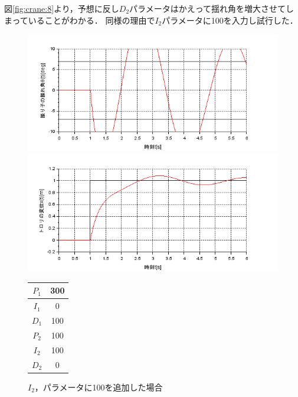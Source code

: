 \documentclass[dvipdfmx,titlepage,a4j]{jsarticle}  %
\begin{document}
図\ref{fig:crane:8}より，予想に反し$D_2$パラメータはかえって揺れ角を増大させてしまっていることがわかる．
同様の理由で$I_2$パラメータに100を入力し試行した．

\begin{figure}[H]
  \begin{minipage}{4.5cm}
    \centering
    \includegraphics[keepaspectratio, scale=0.35]{../graph/crane/ang-P1-300-I1-0-D1-100-P2-100-I2-100-D2-0.png}
  \end{minipage}
  \hfill
  \begin{minipage}{4.5cm}
    \centering
    \includegraphics[keepaspectratio, scale=0.35]{../graph/crane/po-P1-300-I1-0-D1-100-P2-100-I2-100-D2-0.png}
  \end{minipage}
  \hfill
  \begin{minipage}{3cm}
    \begin{center}
      \begin{tabular}{c|c}
        \hline
        $P_1$ & 300 \\ \hline
        $I_1$ & 0   \\ \hline
        $D_1$ & 100 \\ \hline
        $P_2$ & 100 \\ \hline
        $I_2$ & 100 \\ \hline
        $D_2$ & 0   \\
        \hline
      \end{tabular}
    \end{center}
  \end{minipage}
  \hfill
  \caption{$I_2$，パラメータに100を追加した場合}
  \label{fig:crane:9}
\end{figure}
\end{document}
